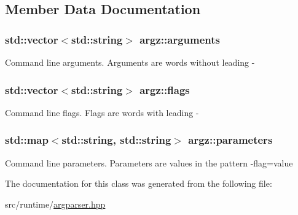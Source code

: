 \subsection{Member Data Documentation}
\subsubsection[{\texorpdfstring{arguments}{arguments}}]{\setlength{\rightskip}{0pt plus 5cm}std\+::vector$<$std\+::string$>$ argz\+::arguments}\hypertarget{classargz_a5368a7c00a82a6cab03ac6bf61f91d8a}{}\label{classargz_a5368a7c00a82a6cab03ac6bf61f91d8a}
Command line arguments. Arguments are words without leading \textquotesingle{}-\/\textquotesingle{} 
\subsubsection[{\texorpdfstring{flags}{flags}}]{\setlength{\rightskip}{0pt plus 5cm}std\+::vector$<$std\+::string$>$ argz\+::flags}\hypertarget{classargz_a97f74aab2350165bd2e2b00e840f8be0}{}\label{classargz_a97f74aab2350165bd2e2b00e840f8be0}
Command line flags. Flags are words with leading \textquotesingle{}-\/\textquotesingle{} 
\subsubsection[{\texorpdfstring{parameters}{parameters}}]{\setlength{\rightskip}{0pt plus 5cm}std\+::map$<$std\+::string, std\+::string$>$ argz\+::parameters}\hypertarget{classargz_ac89e44a2a4910e94e28d06d12c6a95f7}{}\label{classargz_ac89e44a2a4910e94e28d06d12c6a95f7}
Command line parameters. Parameters are values in the pattern -\/flag=value 

The documentation for this class was generated from the following file\+:\begin{DoxyCompactItemize}
\item 
src/runtime/\hyperlink{argparser_8hpp}{argparser.\+hpp}\end{DoxyCompactItemize}
